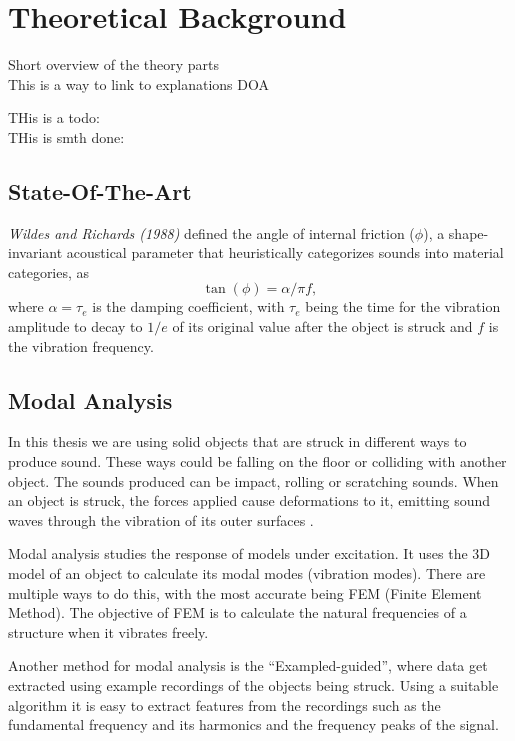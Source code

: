 \chapter{Theoretical Background}\label{ch:theory}
Short overview of the theory parts\\
This is a way to link to explanations \gls{DOA} 

THis is a todo: 
\\
THis is smth done:
\done{}

\section{State-Of-The-Art}\label{sec:state_art}
\textit{Wildes and Richards (1988)} defined the angle of internal friction ($\phi$), a shape-invariant acoustical parameter that heuristically categorizes sounds into material categories, as
\begin{equation}
\tan(\phi) = \alpha / \pi f,
\end{equation}
where $\alpha = \tau_e$ is the damping coefficient, with $\tau_e$ being the time for the vibration amplitude to decay to $1/e$ of its original value after the object is struck  and $f$ is the vibration frequency\cite{giordano2006material}.

\section{Modal Analysis}\label{sec:modal_analysis}
In this thesis we are using solid objects that are struck in different ways to produce sound. These ways could be falling on the floor or colliding with another object. The sounds produced can be impact, rolling or scratching sounds. When an object is struck, the forces applied cause deformations to it, emitting sound waves through the vibration of its outer surfaces \cite{van2001foleyautomatic}.

Modal analysis studies the response of models under excitation. It uses the 3D model of an object to calculate its modal modes (vibration modes). There are multiple ways to do this, with the most accurate being FEM (Finite Element Method). The objective of FEM is to calculate the natural frequencies of a structure when it vibrates freely.

Another method for modal analysis is the ``Exampled-guided'', where data get extracted using example recordings of the objects being struck. Using a suitable algorithm it is easy to extract features from the recordings such as the fundamental frequency and its harmonics and the frequency peaks of the signal.

